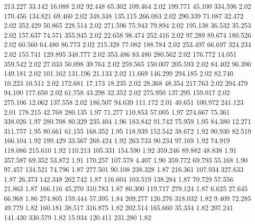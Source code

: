  213.227   33.142   16.088         2.02
  92.448   65.302  109.464         2.02
 199.771   45.100  334.596         2.02
 170.456  134.821   69.460         2.02
 348.348  135.115  266.083         2.02
 290.339   71.087   32.472         2.02
 352.429   50.865  228.514         2.02
 271.596   75.943   79.894         2.02
 195.138   36.532   35.253         2.02
 157.637   74.571  355.945         2.02
  22.658   98.474  252.416         2.02
  97.289   89.674  180.526         2.02
  60.560   64.480   86.773         2.02
 215.328   77.082  188.784         2.02
 253.497   66.697  324.234         2.02
 155.741  129.895  348.777         2.02
 353.486   83.480  280.562         2.02
 176.772   14.051  359.542         2.02
  27.033   50.098   39.764         2.02
 259.565  150.007  205.593         2.02
  84.402   96.390  149.181         2.02
 101.162  131.196   21.133         2.02
  11.669  146.299  294.185         2.02
  82.740   10.223   10.511         2.02
 172.681   17.173   18.235         2.02
  28.368   48.354  217.763         2.02
 204.479   94.100  177.650         2.02
  61.758   43.298   32.352         2.02
 275.950  137.295  159.017         2.02
 275.106   12.062  137.558         2.02
 186.507   94.639  111.172         2.01
  40.651  100.972  241.123         2.01
 178.215   42.768  280.135         1.97
  71.277  110.853   57.005         1.97
 274.667   75.361  338.026         1.97
 280.708   80.329  235.404         1.96
 183.842   91.742   75.959         1.95
  84.380   12.271  311.757         1.95
  80.661   61.155  168.352         1.95
 118.939  152.542   38.672         1.92
  90.930   82.519  166.104         1.92
 199.429   33.567  268.424         1.92
 263.733   90.234   97.169         1.92
  74.919  118.086  215.610         1.92
 110.213  105.331  154.590         1.92
 359.246   89.882   48.838         1.91
 357.587   69.352   53.872         1.91
 170.257  107.578    4.407         1.90
 359.772   69.793   55.168         1.90
  97.457  134.521   74.796         1.87
 277.501   90.108  238.328         1.87
 216.361  107.934  327.633         1.87
  26.373  142.348  262.742         1.87
 116.604  103.519  138.284         1.87
  70.729   57.556   21.863         1.87
 166.116   45.270  310.783         1.87
  80.300  119.717  279.124         1.87
   6.625   27.645   66.968         1.86
 274.805  159.444   57.395         1.84
 209.277  126.276  318.032         1.82
   9.409   72.285   49.779         1.82
 160.181   38.517  316.875         1.82
 202.514  165.660   35.334         1.82
 207.241  141.430  330.579         1.82
  15.934  120.411  231.280         1.82
